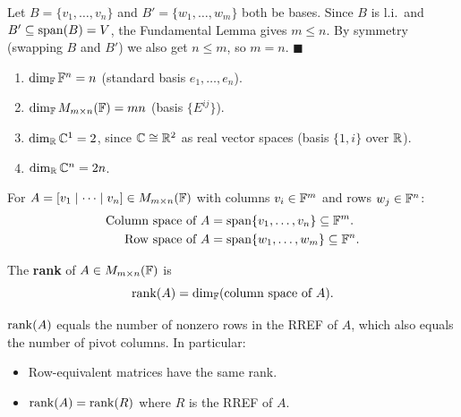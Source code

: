 \begin{proofbox}
Let $B=\{v_1,\ldots,v_n\}$ and $B'=\{w_1,\ldots,w_m\}$ both be bases.
Since $B$ is l.i.\ and $B'\subseteq\operatorname{span}(B)=V$, the Fundamental Lemma gives
$m\le n$.  By symmetry (swapping $B$ and $B'$) we also get $n\le m$, so
$m=n$.
\hfill$\blacksquare$
\end{proofbox}

\begin{exbox}
\begin{enumerate}
    \item $\operatorname{dim}_{\mathbb{F}} \mathbb{F}^n = n$ (standard basis $e_1,\ldots,e_n$).
    \item $\operatorname{dim}_{\mathbb{F}} M_{m\times n}(\mathbb{F}) = mn$ (basis $\{E^{ij}\}$).
    \item $\operatorname{dim}_{\mathbb{R}} \mathbb{C}^1 = 2$, since $\mathbb{C}\cong\mathbb{R}^2$ as real vector spaces
          (basis $\{1,i\}$ over $\mathbb{R}$).
    \item $\operatorname{dim}_{\mathbb{R}} \mathbb{C}^n = 2n$.
\end{enumerate}
\end{exbox}

\begin{defbox}
\label{def:column-row-space}
For $A=[v_1\mid\cdots\mid v_n]\in M_{m\times n}(\mathbb{F})$ with columns $v_i\in\mathbb{F}^m$ and
rows $w_j\in\mathbb{F}^n$:
\begin{align*}
    \text{Column space of }A &= \operatorname{span}\{v_1,\ldots,v_n\} \subseteq \mathbb{F}^m. \\
    \text{Row space of }A    &= \operatorname{span}\{w_1,\ldots,w_m\} \subseteq \mathbb{F}^n.
\end{align*}
\end{defbox}

\begin{defbox}
\label{def:rank-matrix}
The \textbf{rank} of $A\in M_{m\times n}(\mathbb{F})$ is
\[
    \operatorname{rank}(A) = \operatorname{dim}_{\mathbb{F}}(\text{column space of }A).
\]
\end{defbox}

\begin{tipbox}
\label{rem:rank-rref}
$\operatorname{rank}(A)$ equals the number of nonzero rows in the RREF of $A$, which also
equals the number of pivot columns.  In particular:
\begin{itemize}
    \item Row-equivalent matrices have the same rank.
    \item $\operatorname{rank}(A) = \operatorname{rank}(R)$ where $R$ is the RREF of $A$.
\end{itemize}
\end{tipbox}

